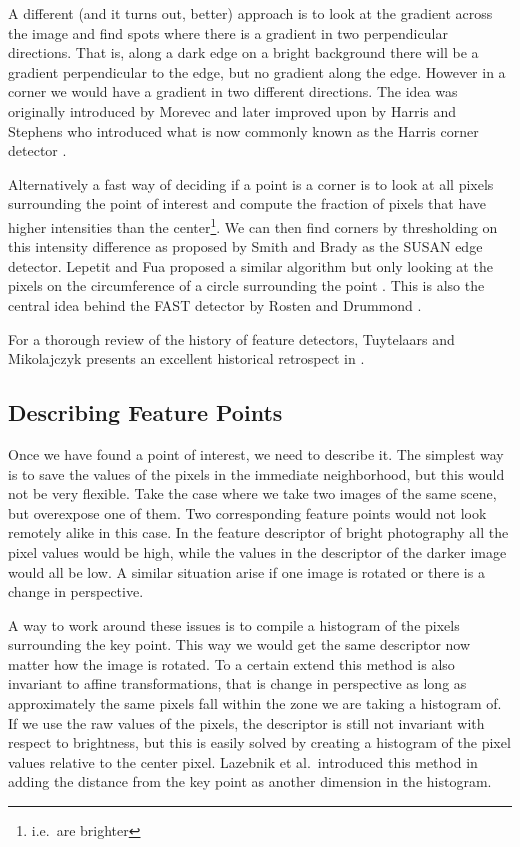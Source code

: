 A different (and it turns out, better) approach is to look at the 
gradient across the image and find spots where there is a gradient in 
two perpendicular directions.  That is, along a dark edge on a bright 
background there will be a gradient perpendicular to the edge, but no 
gradient along the edge.  However in a corner we would have a gradient 
in two different directions. The idea was originally introduced by 
Morevec \cite{hans1977towards} and later improved upon by Harris and 
Stephens who introduced what is now commonly known as the Harris corner 
detector \cite{harris1988combined}.

Alternatively a fast way of deciding if a point is a corner is to look 
at all pixels surrounding the point of interest and compute the fraction 
of pixels that have higher intensities than the center\footnote{i.e.\ 
are brighter}. We can then find corners by thresholding on this 
intensity difference as proposed by Smith and Brady 
\cite{smith1997susan} as the SUSAN edge detector. Lepetit and Fua 
proposed a similar algorithm but only looking at the pixels on the 
circumference of a circle surrounding the point 
\cite{lepetit2006keypoint}. This is also the central idea behind the 
FAST detector by Rosten and Drummond \cite{rosten2006machine}.

For a thorough review of the history of feature detectors, Tuytelaars 
and Mikolajczyk presents an excellent historical retrospect in 
\cite{tuytelaars2008local}.

\subsection{Describing Feature Points}

Once we have found a point of interest, we need to describe it. The 
simplest way is to save the values of the pixels in the immediate 
neighborhood, but this would not be very flexible. Take the case where 
we take two images of the same scene, but overexpose one of them. Two 
corresponding feature points would not look remotely alike in this case.
In the feature descriptor of bright photography all the pixel values 
would be high, while the values in the descriptor of the darker image 
would all be low. A similar situation arise if one image is rotated or 
there is a change in perspective.

A way to work around these issues is to compile a histogram of the 
pixels surrounding the key point. This way we would get the same 
descriptor now matter how the image is rotated. To a certain extend this
method is also invariant to affine transformations, that is change in 
perspective as long as approximately the same pixels fall within the 
zone we are taking a histogram of. If we use the raw values of the 
pixels, the descriptor is still not invariant with respect to 
brightness, but this is easily solved by creating a histogram of the 
pixel values relative to the center pixel. Lazebnik et al.\ introduced 
this method in \cite{lazebnik2003sparse} adding the distance from the 
key point as another dimension in the histogram.

